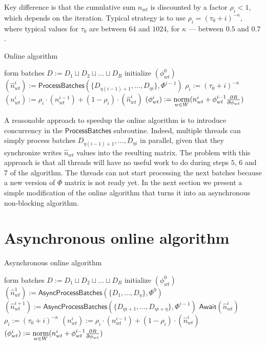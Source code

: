\documentclass[russian,english]{llncs}
\newcommand{\norm}{\mathop{\rm norm}\limits}
\newcommand{\kw}[1]{\textsf{#1}}
\begin{document}
Key difference is that the cumulative sum $n_{wt}$ is discounted by a factor $\rho_i < 1$,
which depends on the iteration. Typical strategy is to use $\rho_i = (\tau_0 + i)^{-\kappa}$,
where typical values for $\tau_0$ are between $64$ and $1024$, for $\kappa$ --- between $0.5$ and $0.7$.

\SetAlgoSkip{}
\begin{algorithm2e}[h]
\caption{Online algorithm} %
\label{alg:Online}
\BlankLine
{}
\BlankLine
form batches $D := D_1 \sqcup D_2 \sqcup \dots \sqcup D_B$\;
initialize $(\phi^0_{wt})$\;
 {
    $(\hat n^i_{wt}) := \kw{ProcessBatches}(\{D_{\eta (i - 1) + 1}, \dots, D_{\eta i}\}, \Phi^{i - 1})$\;
    $\rho_i := (\tau_0 + i)^{-\kappa}$\;
    $(n^{i}_{wt}) := \rho_i \cdot (n^{i-1}_{wt}) + (1 - \rho_i) \cdot (\hat n^{i}_{wt})$\;
    $(\phi^{i}_{wt}) := \norm_{w \in W} (n^{i}_{wt} + \phi^{i - 1}_{wt} \frac{\partial R}{\partial \phi_{wt}})$\;
}
\end{algorithm2e}

A reasonable approach to speedup the online algorithm is to introduce concurrency in the $\kw{ProcessBatches}$ subroutine.
Indeed, multiple threads can simply process batches $D_{\eta (i - 1) + 1}, \dots, D_{\eta i}$ in parallel,
given that they synchronize writes $\hat n_{wt}$ values into the resulting matrix.
The problem with this approach is that all threads will have no useful work to do during steps $5$, $6$ and $7$ of the algorithm.
The threads can not start processing the next batches because a new version of $\Phi$ matrix is not ready yet.
In the next section we present a simple modification of the online algorithm that turns it into an asynchronous non-blocking algorithm.

\section{Asynchronous online algorithm}
\label{sec:Algorithm}

\SetAlgoSkip{}
\begin{algorithm2e}[h]
\caption{Asynchronous online algorithm} %
\label{alg:Online}
\BlankLine
{}
\BlankLine
form batches $D := D_1 \sqcup D_2 \sqcup \dots \sqcup D_B$\;
initialize $(\phi^0_{wt})$\;
$(\hat n^1_{wt}) := \kw{AsyncProcessBatches}(\{D_{1}, \dots, D_{\eta}\}, \Phi^0)$\;
 {
    $(\hat n^{i+1}_{wt}) := \kw{AsyncProcessBatches}(\{D_{\eta i + 1}, \dots, D_{\eta i + \eta}\}, \Phi^{i-1})$\;
    $\kw{Await}(\hat n^i_{wt})$\;
    $\rho_i := (\tau_0 + i)^{-\kappa}$\;
    $(n^{i}_{wt}) := \rho_i \cdot (n^{i-1}_{wt}) + (1 - \rho_i) \cdot (\hat n^{i}_{wt})$\;
    $(\phi^{i}_{wt}) := \norm_{w \in W} (n^{i}_{wt} + \phi^{i-1}_{wt} \frac{\partial R}{\partial \phi_{wt}})$\;
}
\end{algorithm2e}
\end{document}
